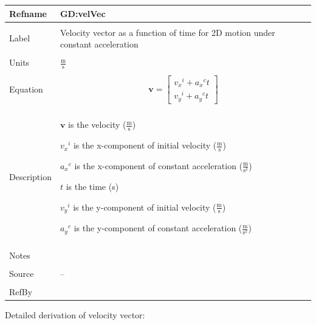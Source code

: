 \documentclass[12pt]{article}
\begin{document}
\noindent \begin{minipage}{\textwidth}
\begin{tabular}{p{} p{}}
\toprule \textbf{Refname} & \textbf{GD:velVec}
\label{GD:velVec}
\\ \midrule \\
Label & Velocity vector as a function of time for 2D motion under constant acceleration
\\ \midrule \\
Units & $\frac{\text{m}}{\text{s}}$
\\ \midrule \\
Equation & \begin{displaymath}
           \mathbf{v}=\begin{bmatrix}
{{v_{x}}^{i}}+{{a_{x}}^{c}} t\\
{{v_{y}}^{i}}+{{a_{y}}^{c}} t
\end{bmatrix}
           \end{displaymath}
\\ \midrule \\
Description & \begin{symbDescription}
              \item{$\mathbf{v}$ is the velocity ($\frac{\text{m}}{\text{s}}$)}
              \item{${{v_{x}}^{i}}$ is the x-component of initial velocity ($\frac{\text{m}}{\text{s}}$)}
              \item{${{a_{x}}^{c}}$ is the x-component of constant acceleration ($\frac{\text{m}}{\text{s}^{2}}$)}
              \item{$t$ is the time (s)}
              \item{${{v_{y}}^{i}}$ is the y-component of initial velocity ($\frac{\text{m}}{\text{s}}$)}
              \item{${{a_{y}}^{c}}$ is the y-component of constant acceleration ($\frac{\text{m}}{\text{s}^{2}}$)}
              \end{symbDescription}
\\ \midrule \\
Notes & 
\\ \midrule \\
Source & --
\\ \midrule \\
RefBy & 
\\ \bottomrule \end{tabular}
\end{minipage}
Detailed derivation of velocity vector:
\end{document}
